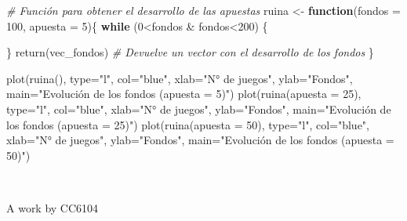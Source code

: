 \documentclass[]{article}
\newenvironment{Shaded}{\begin{snugshade}}{\end{snugshade}}
\newcommand{\AttributeTok}[1]{\textcolor[rgb]{0.77,0.63,0.00}{#1}}
\newcommand{\CommentTok}[1]{\textcolor[rgb]{0.56,0.35,0.01}{\textit{#1}}}
\newcommand{\ControlFlowTok}[1]{\textcolor[rgb]{0.13,0.29,0.53}{\textbf{#1}}}
\newcommand{\DecValTok}[1]{\textcolor[rgb]{0.00,0.00,0.81}{#1}}
\newcommand{\FunctionTok}[1]{\textcolor[rgb]{0.00,0.00,0.00}{#1}}
\newcommand{\NormalTok}[1]{#1}
\newcommand{\OtherTok}[1]{\textcolor[rgb]{0.56,0.35,0.01}{#1}}
\newcommand{\SpecialCharTok}[1]{\textcolor[rgb]{0.00,0.00,0.00}{#1}}
\newcommand{\StringTok}[1]{\textcolor[rgb]{0.31,0.60,0.02}{#1}}
\begin{document}
\begin{Shaded}
\begin{Highlighting}[]
\CommentTok{\# Función para obtener el desarrollo de las apuestas}
\NormalTok{ruina }\OtherTok{\textless{}{-}} \ControlFlowTok{function}\NormalTok{(}\AttributeTok{fondos =} \DecValTok{100}\NormalTok{, }\AttributeTok{apuesta =} \DecValTok{5}\NormalTok{)\{}
  \ControlFlowTok{while}\NormalTok{ (}\DecValTok{0}\SpecialCharTok{\textless{}}\NormalTok{fondos }\SpecialCharTok{\&}\NormalTok{ fondos}\SpecialCharTok{\textless{}}\DecValTok{200}\NormalTok{) \{}
    
\NormalTok{  \}}
  \FunctionTok{return}\NormalTok{(vec\_fondos) }\CommentTok{\# Devuelve un vector con el desarrollo de los fondos}
\NormalTok{\}}

\FunctionTok{plot}\NormalTok{(}\FunctionTok{ruina}\NormalTok{(), }\AttributeTok{type=}\StringTok{"l"}\NormalTok{, }\AttributeTok{col=}\StringTok{"blue"}\NormalTok{, }\AttributeTok{xlab=}\StringTok{"N° de juegos"}\NormalTok{, }\AttributeTok{ylab=}\StringTok{"Fondos"}\NormalTok{, }\AttributeTok{main=}\StringTok{"Evolución de los fondos (apuesta = 5)"}\NormalTok{)}
\FunctionTok{plot}\NormalTok{(}\FunctionTok{ruina}\NormalTok{(}\AttributeTok{apuesta =} \DecValTok{25}\NormalTok{), }\AttributeTok{type=}\StringTok{"l"}\NormalTok{, }\AttributeTok{col=}\StringTok{"blue"}\NormalTok{, }\AttributeTok{xlab=}\StringTok{"N° de juegos"}\NormalTok{, }\AttributeTok{ylab=}\StringTok{"Fondos"}\NormalTok{, }\AttributeTok{main=}\StringTok{"Evolución de los fondos (apuesta = 25)"}\NormalTok{)}
\FunctionTok{plot}\NormalTok{(}\FunctionTok{ruina}\NormalTok{(}\AttributeTok{apuesta =} \DecValTok{50}\NormalTok{), }\AttributeTok{type=}\StringTok{"l"}\NormalTok{, }\AttributeTok{col=}\StringTok{"blue"}\NormalTok{, }\AttributeTok{xlab=}\StringTok{"N° de juegos"}\NormalTok{, }\AttributeTok{ylab=}\StringTok{"Fondos"}\NormalTok{, }\AttributeTok{main=}\StringTok{"Evolución de los fondos (apuesta = 50)"}\NormalTok{)}
\end{Highlighting}
\end{Shaded}

~

A work by CC6104

~
\end{document}
